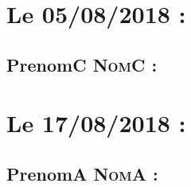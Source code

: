 \newpage
\section{Le 05/08/2018 :}
    \subsection{PrenomC \textsc{NomC} :}
        
\newpage
\section{Le 17/08/2018 :}
    \subsection{PrenomA \textsc{NomA} :}
        
